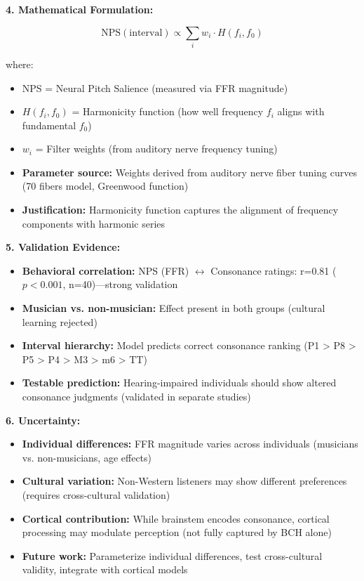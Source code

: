 \documentclass[9pt,onecolumn]{article}
\begin{document}
\textbf{4. Mathematical Formulation:}

\begin{equation}
\text{NPS}(\text{interval}) \propto \sum_i w_i \cdot H(f_i, f_0)
\label{eq:nps}
\end{equation}

where:
\begin{itemize}[leftmargin=*, topsep=1pt, itemsep=1pt]
    \item NPS = Neural Pitch Salience (measured via FFR magnitude)
    \item $H(f_i, f_0)$ = Harmonicity function (how well frequency $f_i$ aligns with fundamental $f_0$)
    \item $w_i$ = Filter weights (from auditory nerve frequency tuning)
    \item \textbf{Parameter source:} Weights derived from auditory nerve fiber tuning curves (70 fibers model, Greenwood function)
    \item \textbf{Justification:} Harmonicity function captures the alignment of frequency components with harmonic series
\end{itemize}

\textbf{5. Validation Evidence:}
\begin{itemize}[leftmargin=*, topsep=1pt, itemsep=1pt]
    \item \textbf{Behavioral correlation:} NPS (FFR) $\leftrightarrow$ Consonance ratings: r=0.81 ($p<0.001$, n=40)---strong validation
    \item \textbf{Musician vs. non-musician:} Effect present in both groups (cultural learning rejected)
    \item \textbf{Interval hierarchy:} Model predicts correct consonance ranking (P1 > P8 > P5 > P4 > M3 > m6 > TT)
    \item \textbf{Testable prediction:} Hearing-impaired individuals should show altered consonance judgments (validated in separate studies)
\end{itemize}

\textbf{6. Uncertainty:}
\begin{itemize}[leftmargin=*, topsep=1pt, itemsep=1pt]
    \item \textbf{Individual differences:} FFR magnitude varies across individuals (musicians vs. non-musicians, age effects)
    \item \textbf{Cultural variation:} Non-Western listeners may show different preferences (requires cross-cultural validation)
    \item \textbf{Cortical contribution:} While brainstem encodes consonance, cortical processing may modulate perception (not fully captured by BCH alone)
    \item \textbf{Future work:} Parameterize individual differences, test cross-cultural validity, integrate with cortical models
\end{itemize}
\end{document}
